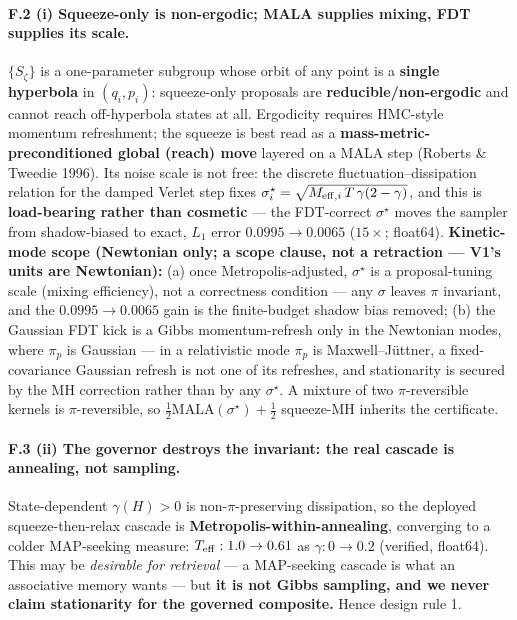 \documentclass[11pt]{article}
\newcommand{\half}{\tfrac12}
\begin{document}
\paragraph{F.2 (i) Squeeze-only is non-ergodic; MALA supplies mixing, FDT supplies its scale.} $\{S_\zeta\}$ is a one-parameter subgroup whose orbit of any point is a \textbf{single hyperbola} in $(q_i,p_i)$: squeeze-only proposals are \textbf{reducible/non-ergodic} and cannot reach off-hyperbola states at all. Ergodicity requires HMC-style momentum refreshment; the squeeze is best read as a \textbf{mass-metric-preconditioned global (reach) move} layered on a MALA step (Roberts \& Tweedie 1996). Its noise scale is not free: the discrete fluctuation--dissipation relation for the damped Verlet step fixes $\sigma_i^\star=\sqrt{M_{{\rm eff},i}\,T\,\gamma(2-\gamma)}$, and this is \textbf{load-bearing rather than cosmetic} --- the FDT-correct $\sigma^\star$ moves the sampler from shadow-biased to exact, $L_1$ error $0.0995\to0.0065$ ($15\times$; float64). \textbf{Kinetic-mode scope (Newtonian only; a scope clause, not a retraction --- V1's units are Newtonian):} (a) once Metropolis-adjusted, $\sigma^\star$ is a proposal-tuning scale (mixing efficiency), not a correctness condition --- any $\sigma$ leaves $\pi$ invariant, and the $0.0995\to0.0065$ gain is the finite-budget shadow bias removed; (b) the Gaussian FDT kick is a Gibbs momentum-refresh only in the Newtonian modes, where $\pi_p$ is Gaussian --- in a relativistic mode $\pi_p$ is Maxwell--J\"uttner, a fixed-covariance Gaussian refresh is not one of its refreshes, and stationarity is secured by the MH correction rather than by any $\sigma^\star$. A mixture of two $\pi$-reversible kernels is $\pi$-reversible, so $\half\mathrm{MALA}(\sigma^\star)+\half$ squeeze-MH inherits the certificate.

\paragraph{F.3 (ii) The governor destroys the invariant: the real cascade is annealing, not sampling.} State-dependent $\gamma(H)>0$ is non-$\pi$-preserving dissipation, so the deployed squeeze-then-relax cascade is \textbf{Metropolis-within-annealing}, converging to a colder MAP-seeking measure: $T_{\rm eff}:1.0\to0.61$ as $\gamma:0\to0.2$ (verified, float64). This may be \emph{desirable for retrieval} --- a MAP-seeking cascade is what an associative memory wants --- but \textbf{it is not Gibbs sampling, and we never claim stationarity for the governed composite.} Hence design rule 1.
\end{document}

